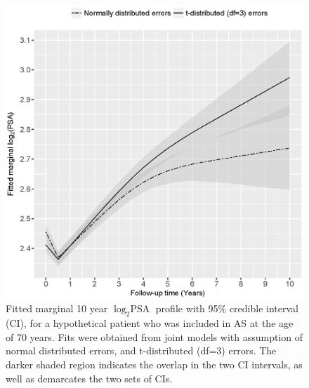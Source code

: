 \begin{enumerate}
	\begin{figure}[!htb]
	\centerline{\includegraphics[width=0.75\columnwidth]{images/model_fit/marginal_fitted_psa_NormalVsT3.eps}}
	\caption{Fitted marginal 10 year $\log_2 \mbox{PSA}$ profile with 95\% credible interval (CI), for a hypothetical patient who was included in AS at the age of 70 years. Fits were obtained from joint models with assumption of normal distributed errors, and t-distributed (df=3) errors. The darker shaded region indicates the overlap in the two CI intervals, as well as demarcates the two sets of CIs.}
	\label{fig : marginal_fitted_psa_NormalVsT3}
	\end{figure}		
	

\end{enumerate}
